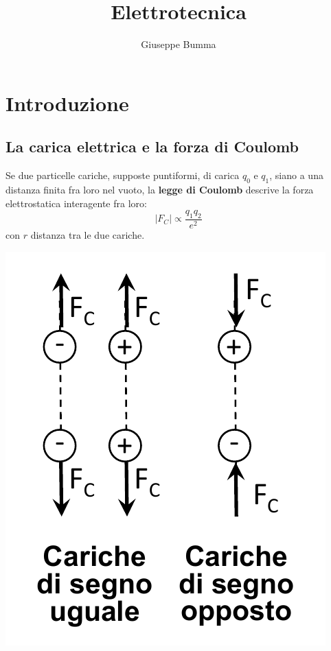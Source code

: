 \documentclass{article}
\title{Elettrotecnica}
\author{Giuseppe Bumma}
\begin{document}
\newcommand{\R}{\mathbb{R}}
\newcommand{\bb}[1]{\mathbb{#1}}
\newcommand{\cc}[1]{\mathcal{#1}}
\newcommand{ \lognormal }{\text{Lognormal} }
\newcommand{\tb}[1]{\textbf{#1}}
\newcommand*\circled[1]{\tikz[baseline=(char.base)]{%
            \node[shape=circle,draw,inner sep=2pt] (char) {#1};}}


\tableofcontents

\maketitle

\section{Introduzione}

\subsection{La carica elettrica e la forza di Coulomb}
Se due particelle cariche, supposte puntiformi, di carica $q_0$ e $q_1$, siano a una distanza finita fra loro nel vuoto, la \textbf{legge di Coulomb} descrive la forza elettrostatica interagente fra loro:
\[
    |F_C| \propto \frac{q_1q_2}{e^2}
\]
con $r$ distanza tra le due cariche.

\begin{center}
    \includegraphics[scale=0.3]{Image/Forza di Coulomb.png}
\end{center}
\end{document}
